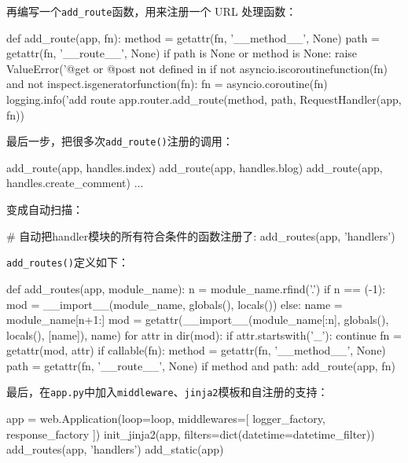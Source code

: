 再编写一个\texttt{add\_route}函数，用来注册一个 URL 处理函数：

\begin{pythoncode}
def add_route(app, fn):
    method = getattr(fn, '__method__', None)
    path = getattr(fn, '__route__', None)
    if path is None or method is None:
        raise ValueError('@get or @post not defined in %
    if not asyncio.iscoroutinefunction(fn) and not inspect.isgeneratorfunction(fn):
        fn = asyncio.coroutine(fn)
    logging.info('add route %
    app.router.add_route(method, path, RequestHandler(app, fn))
\end{pythoncode}

最后一步，把很多次\texttt{add\_route()}注册的调用：

\begin{pythoncode}
add_route(app, handles.index)
add_route(app, handles.blog)
add_route(app, handles.create_comment)
...
\end{pythoncode}

变成自动扫描：

\begin{pythoncode}
# 自动把handler模块的所有符合条件的函数注册了:
add_routes(app, 'handlers')
\end{pythoncode}

\texttt{add\_routes()}定义如下：

\begin{pythoncode}
def add_routes(app, module_name):
    n = module_name.rfind('.')
    if n == (-1):
        mod = __import__(module_name, globals(), locals())
    else:
        name = module_name[n+1:]
        mod = getattr(__import__(module_name[:n], globals(), locals(), [name]), name)
    for attr in dir(mod):
        if attr.startswith('_'):
            continue
        fn = getattr(mod, attr)
        if callable(fn):
            method = getattr(fn, '__method__', None)
            path = getattr(fn, '__route__', None)
            if method and path:
                add_route(app, fn)
\end{pythoncode}

最后，在\texttt{app.py}中加入\texttt{middleware}、\texttt{jinja2}模板和自注册的支持：

\begin{pythoncode}
app = web.Application(loop=loop, middlewares=[
    logger_factory, response_factory
])
init_jinja2(app, filters=dict(datetime=datetime_filter))
add_routes(app, 'handlers')
add_static(app)
\end{pythoncode}

